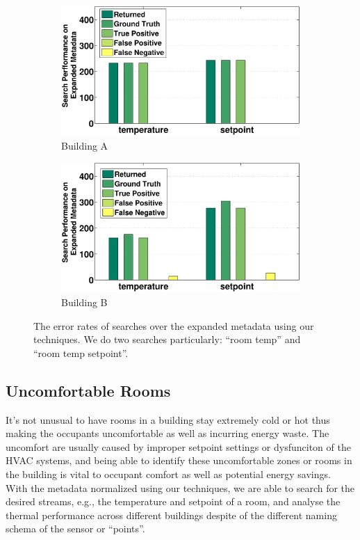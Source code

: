 \begin{figure}[h]
\centering
	\begin{subfigure}{0.48\textwidth}
                \centering
		\includegraphics[width=\textwidth]{./figs/50-soda.eps}
                \caption{Building A}
	\end{subfigure}
	\begin{subfigure}{0.48\textwidth}
                \centering
		\includegraphics[width=\textwidth]{./figs/50-sdh.eps}
                \caption{Building B}
	\end{subfigure}
\caption{The error rates of searches over the expanded metadata using our techniques. We do two searches particularly: ``room temp'' and ``room temp setpoint''.}
\label{fig:cdf_temp}
\end{figure}

\subsection{Uncomfortable Rooms}
It's not unusual to have rooms in a building stay extremely cold or hot thus making the occupants uncomfortable as well as incurring energy waste. The uncomfort are usually caused by improper setpoint settings or dysfunciton of the HVAC systems, and being able to identify these uncomfortable zones or rooms in the building is vital to occupant comfort as well as potential energy savings. With the metadata normalized using our techniques, we are able to search for the desired streams, e.g., the temperature and setpoint of a room,  and analyse the thermal performance across different buildings despite of the different naming schema of the sensor or ``points''.

